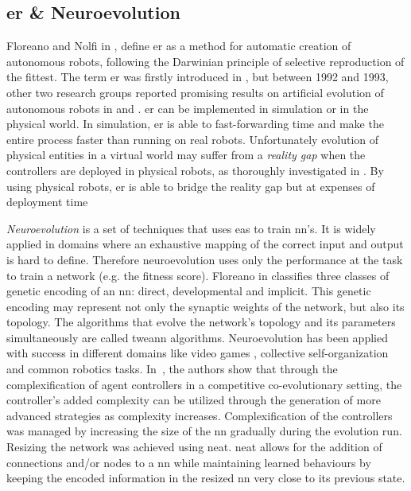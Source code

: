 \documentclass[conference]{IEEEtran}
\begin{document}
\subsection{\acrlong{er} \& Neuroevolution}
Floreano and Nolfi in \cite{nolfi2000evolutionary}, define \gls{er} as a method for automatic creation of autonomous robots, following the Darwinian principle of selective reproduction of the fittest.
The term \acrlong{er} was firstly introduced in \cite{cli1993evolving}, but between 1992 and 1993, other two research groups reported promising results on artificial evolution of autonomous robots in \cite{lewis1992genetic} and \cite{nolfi1994evolve}.
\gls{er} can be implemented in simulation or in the physical world.
In simulation, \gls{er} is able to fast-forwarding time and make the entire process faster than running on real robots.
Unfortunately evolution of physical entities in a virtual world may suffer from a \textit{reality gap} when the controllers are deployed in physical robots, as thoroughly investigated in \cite{jakobi1995noise}.
By using physical robots, \gls{er} is able to bridge the reality gap but at expenses of deployment time

\textit{Neuroevolution} is a set of techniques that uses \glspl{ea} to train \gls{nn}'s.
It is widely applied in domains where an exhaustive mapping of the correct input and output is hard to define.
Therefore neuroevolution uses only the performance at the task to train a network (e.g. the fitness score).
Floreano in \cite{floreano2008neuroevolution} classifies three classes of genetic encoding of an \gls{nn}: direct, developmental and implicit.
This genetic encoding may represent not only the synaptic weights of the network, but also its topology.
The algorithms that evolve the network's topology and its parameters simultaneously are called \gls{tweann} algorithms.
Neuroevolution has been applied with success in different domains like video games \cite{stanley2005real} \cite{hausknecht2014neuroevolution}, collective self-organization \cite{nitschke2008neuro} \cite{nitschke2010collective} and common robotics tasks. %
In~\cite{stanley2004competitive}, the authors show that through the complexification of agent controllers in a competitive co-evolutionary setting, the controller's added complexity can be utilized through the generation of more advanced strategies as complexity increases. 
Complexification of the controllers was managed by increasing the size of the \gls{nn} gradually during the evolution run.
Resizing the network was achieved using \gls{neat}.
\gls{neat} allows for the addition of connections and/or nodes to a \gls{nn} while maintaining learned behaviours by keeping the encoded information in the resized \gls{nn} very close to its previous state.
\end{document}
